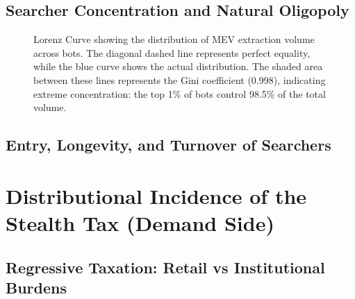 \documentclass[pdflatex, sn-basic]{sn-jnl}
\theoremstyle{thmstylethree}%
\begin{document}
	\subsection{Searcher Concentration and Natural Oligopoly}
	\label{subsec:searcher-concentration}


	\begin{figure}[t]
		\centering
		
		\caption{Lorenz Curve showing the distribution of MEV extraction volume across bots.
		The diagonal dashed line represents perfect equality, while the blue curve shows the actual distribution.
		The shaded area between these lines represents the Gini coefficient (\num{0.998}), indicating extreme concentration: the top \num{1}\% of bots control \num{98.5}\% of the total volume.}
		\label{fig:lorenz-curve}
	\end{figure}

	\subsection{Entry, Longevity, and Turnover of Searchers}
	\label{subsec:searcher-dynamics}

	\section{Distributional Incidence of the Stealth Tax (Demand Side)}
	\label{sec:demand-side-incidence}

	\subsection{Regressive Taxation: Retail vs Institutional Burdens}
	\label{subsec:regressive-tax}
\end{document}
